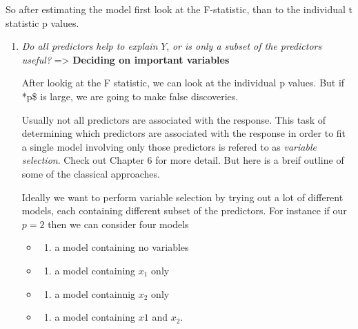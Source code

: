 \documentclass[
  letterpaper,
  DIV=11,
  numbers=noendperiod]{scrreprt}
\providecommand{\tightlist}{%
  \setlength{\itemsep}{0pt}\setlength{\parskip}{0pt}}\usepackage{longtable,booktabs,array}
\begin{document}
So after estimating the model first look at the F-statistic, than to the
individual t statistic p values.

\begin{enumerate}
\def\labelenumi{\arabic{enumi}.}
\setcounter{enumi}{1}
\item
  \emph{Do all predictors help to explain} \(Y\), \emph{or is only a
  subset of the predictors useful?} =\textgreater{} \textbf{Deciding on
  important variables}

  After lookig at the F statistic, we can look at the individual p
  values. But if *p\$ is large, we are going to make false discoveries.

  Usually not all predictors are associated with the response. This task
  of determining which predictors are associated with the response in
  order to fit a single model involving only those predictors is refered
  to as \emph{variable selection}. Check out Chapter 6 for more detail.
  But here is a breif outline of some of the classical approaches.

  Ideally we want to perform variable selection by trying out a lot of
  different models, each containing different subset of the predictors.
  For instance if our \(p=2\) then we can consider four models

  \begin{itemize}
  \item
    \begin{enumerate}
    \def\labelenumii{(\arabic{enumii})}
    \tightlist
    \item
      a model containing no variables
    \end{enumerate}
  \item
    \begin{enumerate}
    \def\labelenumii{(\arabic{enumii})}
    \setcounter{enumii}{1}
    \tightlist
    \item
      a model containing \(x_1\) only
    \end{enumerate}
  \item
    \begin{enumerate}
    \def\labelenumii{(\arabic{enumii})}
    \setcounter{enumii}{2}
    \tightlist
    \item
      a model containnig \(x_2\) only
    \end{enumerate}
  \item
    \begin{enumerate}
    \def\labelenumii{(\arabic{enumii})}
    \setcounter{enumii}{3}
    \tightlist
    \item
      a model containing \(x1\) and \(x_2\).
    \end{enumerate}
  \end{itemize}


\end{enumerate}
\end{document}
